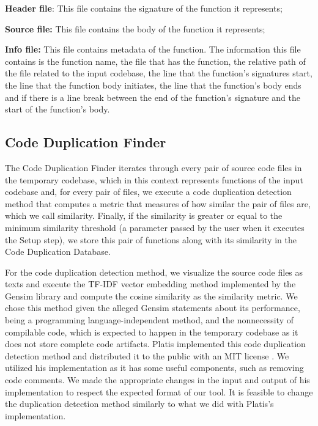 \begin{itemize}
	\begin{item}
		\textbf{Header file}: This file contains the signature of the function it represents;
	\end{item}
	\begin{item}
		\textbf{Source file:} This file contains the body of the function it represents;
	\end{item}
	\begin{item}
		\textbf{Info file:} This file contains metadata of the function. The information this 
		file contains is the function name, the file that has the function, the relative path 
		of the file related to the input codebase, the line that the function’s signatures 
		start, the line that the function body initiates, the line that the function’s body 
		ends and if there is a line break between the end of the function’s signature and the 
		start of the function’s body.
	\end{item}
\end{itemize}

\subsection{Code Duplication Finder}

The Code Duplication Finder iterates through every pair of source code files in the temporary 
codebase, which in this context represents functions of the input codebase and, for every pair 
of files, we execute a code duplication detection method that computes a metric that measures 
of how similar the pair of files are, which we call similarity. Finally, if the similarity is 
greater or equal to the minimum similarity threshold (a parameter passed by the user when it 
executes the Setup step), we store this pair of functions along with its similarity in the 
Code Duplication Database.

For the code duplication detection method, we visualize the source code files as texts and 
execute the TF-IDF vector embedding method implemented by the Gensim library \citep{gensim}
and compute the cosine similarity as the similarity metric. We chose this method given the
alleged Gensim statements about its performance, being a programming language-independent 
method, and the nonnecessity of compilable code, which is expected to happen in the temporary 
codebase as it does not store complete code artifacts. Platis implemented this code 
duplication detection method and distributed it to the public with an MIT license
\citep{platistool,mitlicense}.
We utilized his implementation as it has some useful components, such as removing code 
comments. We made the appropriate changes in the input and output of his implementation 
to respect the expected format of our tool. It is feasible to change the duplication 
detection method similarly to what we did with Platis’s implementation.

